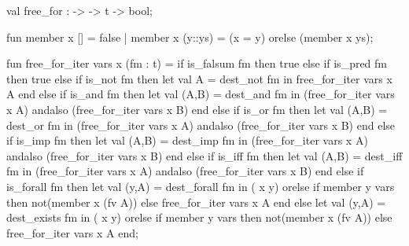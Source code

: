 \nwenddocs{}\plusendmoddef\nwstartdeflinemarkup{}\nwenddeflinemarkup
val free_for :  ->  -> t -> bool;
\nwendcode{}\nwdocspar

\nwenddocs{}\endmoddef\nwstartdeflinemarkup{}\nwenddeflinemarkup
fun member x [] = false
  | member x (y::ys) = (x = y) orelse (member x ys);

fun free_for_iter vars x (fm : t) =
  if is_falsum fm then true
  else if is_pred fm then true
  else if is_not fm
  then let val A = dest_not fm
       in free_for_iter vars x A end
  else if is_and fm
  then let val (A,B) = dest_and fm
       in (free_for_iter vars x A) andalso (free_for_iter vars x B) end
  else if is_or fm
  then let val (A,B) = dest_or fm
       in (free_for_iter vars x A) andalso (free_for_iter vars x B) end
  else if is_imp fm
  then let val (A,B) = dest_imp fm
       in (free_for_iter vars x A) andalso (free_for_iter vars x B) end
  else if is_iff fm
  then let val (A,B) = dest_iff fm
       in (free_for_iter vars x A) andalso (free_for_iter vars x B) end
  else if is_forall fm
  then let val (y,A) = dest_forall fm
       in ( x y) orelse
          if member y vars
          then not(member x (fv A))
          else free_for_iter vars x A
       end
  else let val (y,A) = dest_exists fm
       in ( x y) orelse
          if member y vars
          then not(member x (fv A))
          else free_for_iter vars x A
       end;

